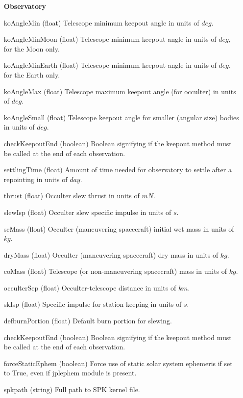 \documentclass[cleanfoot]{asme2ej}
\begin{document}
\begin{itemize}[leftmargin=1.5in,font={\ttfamily}]
\item[\textbf{Observatory}]
\item[koAngleMin] (float) Telescope minimum keepout angle in units of $deg$. 
\item[koAngleMinMoon] (float) Telescope minimum keepout angle in units of $deg$, for the Moon only.
\item[koAngleMinEarth] (float) Telescope minimum keepout angle in units of $deg$, for the Earth only.
\item[koAngleMax] (float) Telescope maximum keepout angle (for occulter) in units of $deg$. 
\item[koAngleSmall] (float) Telescope keepout angle for smaller (angular size) bodies in units of $deg$. 
\item[checkKeepoutEnd] (boolean) Boolean signifying if the keepout method must be called at the end of each observation.
\item[settlingTime] (float) Amount of time needed for observatory to settle after a repointing in units of $ day $.
\item[thrust] (float) Occulter slew thrust in units of $ mN $.
\item[slewIsp] (float) Occulter slew specific impulse in units of $ s $.
\item[scMass] (float) Occulter (maneuvering spacecraft) initial wet mass in units of $ kg $. 
\item[dryMass] (float) Occulter (maneuvering spacecraft) dry mass in units of $ kg $. 
\item[coMass] (float) Telescope (or non-maneuvering spacecraft) mass in units of $ kg $. 
\item[occulterSep] (float) Occulter-telescope distance in units of $ km $. 
\item[skIsp] (float) Specific impulse for station keeping in units of $ s $. 
\item[defburnPortion] (float) Default burn portion for slewing.
\item[checkKeepoutEnd] (boolean) Boolean signifying if the keepout method must be called at the end of each observation.
\item[forceStaticEphem]  (boolean) Force use of static solar system ephemeris if set to True, even if jplephem module is present.
\item[spkpath] (string) Full path to SPK kernel file.


\end{itemize}
\end{document}
